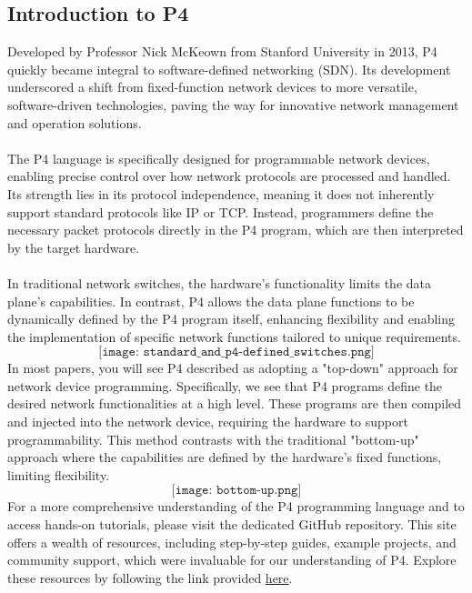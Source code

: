 \subsection{Introduction to P4}
Developed by Professor Nick McKeown from Stanford University in 2013, P4 quickly became integral to software-defined networking (SDN). Its development underscored a shift from fixed-function network devices to more versatile, software-driven technologies, paving the way for innovative network management and operation solutions.\\
\\
The P4 language is specifically designed for programmable network devices, enabling precise control over how network protocols are processed and handled. Its strength lies in its protocol independence, meaning it does not inherently support standard protocols like IP or TCP. Instead, programmers define the necessary packet protocols directly in the P4 program, which are then interpreted by the target hardware.\\
\\
In traditional network switches, the hardware's functionality limits the data plane's capabilities. In contrast, P4 allows the data plane functions to be dynamically defined by the P4 program itself, enhancing flexibility and enabling the implementation of specific network functions tailored to unique requirements.\\
$$
\texttt{[image: standard\_and\_p4-defined\_switches.png]}
$$
In most papers, you will see P4 described as adopting a "top-down" approach for network device programming. Specifically, we see that P4 programs define the desired network functionalities at a high level. These programs are then compiled and injected into the network device, requiring the hardware to support programmability. This method contrasts with the traditional "bottom-up" approach where the capabilities are defined by the hardware's fixed functions, limiting flexibility.
$$
\texttt{[image: bottom-up.png]}
$$
For a more comprehensive understanding of the P4 programming language and to access hands-on tutorials, please visit the dedicated GitHub repository. This site offers a wealth of resources, including step-by-step guides, example projects, and community support, which were invaluable for our understanding of P4. Explore these resources by following the link provided \href{https://github.com/p4lang/tutorials}{here}.
